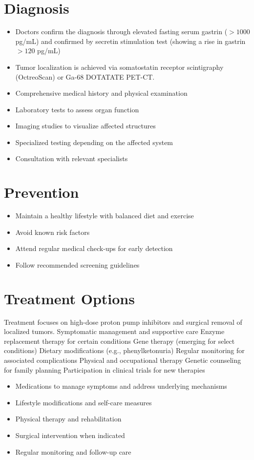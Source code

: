 \section{Diagnosis}
\begin{itemize}[noitemsep]
  \item Doctors confirm the diagnosis through elevated fasting serum gastrin ($>1000$ pg/mL) and confirmed by secretin stimulation test (showing a rise in gastrin $>120$ pg/mL)
  \item Tumor localization is achieved via somatostatin receptor scintigraphy (OctreoScan) or Ga-68 DOTATATE PET-CT.
  \item Comprehensive medical history and physical examination
  \item Laboratory tests to assess organ function
  \item Imaging studies to visualize affected structures
  \item Specialized testing depending on the affected system
  \item Consultation with relevant specialists
\end{itemize}
\section{Prevention}
\begin{itemize}[noitemsep]
  \item Maintain a healthy lifestyle with balanced diet and exercise
  \item Avoid known risk factors
  \item Attend regular medical check-ups for early detection
  \item Follow recommended screening guidelines
\end{itemize}
\section{Treatment Options}
Treatment focuses on high-dose proton pump inhibitors and surgical removal of localized tumors. Symptomatic management and supportive care Enzyme replacement therapy for certain conditions Gene therapy (emerging for select conditions) Dietary modifications (e.g., phenylketonuria) Regular monitoring for associated complications Physical and occupational therapy Genetic counseling for family planning Participation in clinical trials for new therapies

\begin{itemize}[noitemsep]
  \item Medications to manage symptoms and address underlying mechanisms
  \item Lifestyle modifications and self-care measures
  \item Physical therapy and rehabilitation
  \item Surgical intervention when indicated
  \item Regular monitoring and follow-up care
\end{itemize}
